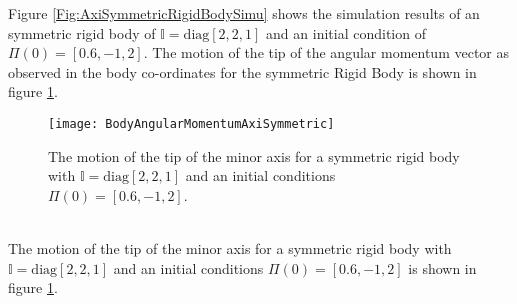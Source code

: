 \documentclass[graybox,envcountchap,sectrefs]{svmonoMuga}
\begin{document}
Figure \ref{Fig:AxiSymmetricRigidBodySimu} shows the simulation results of an symmetric rigid body of $\mathbb{I}=\mathrm{diag}[2,2,1]$ and an initial condition of $\Pi(0)=[0.6,-1,2]$.
The motion of the tip of the angular momentum vector as observed in the body co-ordinates for the symmetric Rigid Body is shown in figure 
\ref{Fig:AxiSymmetricRigidBodyBodyAngular}.\\ \begin{figure}[ht]
\begin{center}
\texttt{[image: BodyAngularMomentumAxiSymmetric]}
\renewcommand{\baselinestretch}{1}\selectfont
\caption{The motion of the tip of the minor axis for a symmetric rigid body with $\mathbb{I}=\mathrm{diag}[2,2,1]$ and an initial conditions 
$\Pi(0)=[0.6,-1,2]$.}
\label{Fig:AxiSymmetricRigidBodyBodyAngular}
\renewcommand{\baselinestretch}{1.5}\selectfont
\end{center}
\end{figure}
\\
The motion of the tip of the minor axis for a symmetric rigid body with $\mathbb{I}=\mathrm{diag}[2,2,1]$ and an initial conditions 
$\Pi(0)=[0.6,-1,2]$ is shown in figure \ref{Fig:AxiSymmetricRigidBodyBodyAngular}.



\end{document}
